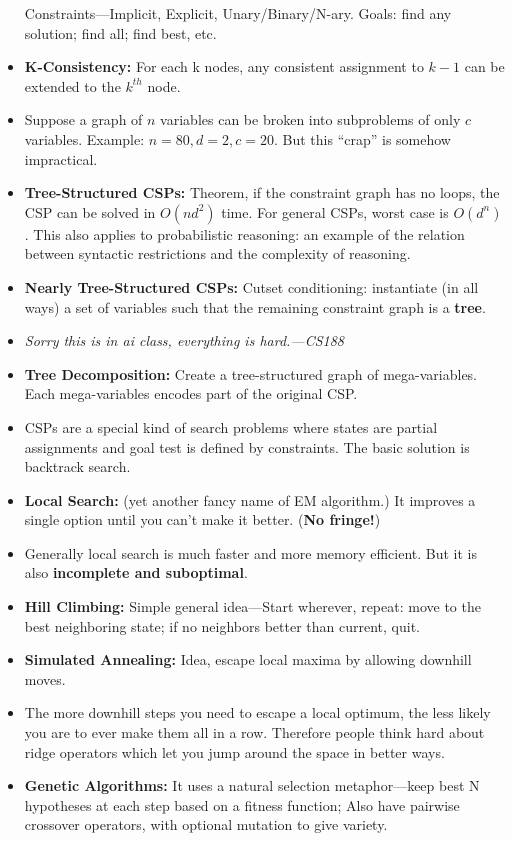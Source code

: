 \documentclass[twocolumn]{article}
\begin{document}
\begin{itemize}
  Constraints---Implicit, Explicit, Unary/Binary/N-ary. Goals: find
  any solution; find all; find best, etc.
\item \textbf{K-Consistency:} For each k nodes, any consistent
  assignment to $k-1$ can be extended to the $k^{th}$ node.
\item Suppose a graph of $n$ variables can be broken into subproblems
  of only $c$ variables. Example: $n=80, d=2, c=20$. But this ``crap''
  is somehow impractical. 
\item \textbf{Tree-Structured CSPs:} Theorem, if the constraint graph
  has no loops, the CSP can be solved in $O(nd^{2})$ time. For general
  CSPs, worst case is $O(d^{n})$. This also applies to probabilistic
  reasoning: an example of the relation between syntactic restrictions
  and the complexity of reasoning.
\item \textbf{Nearly Tree-Structured CSPs:} Cutset conditioning:
  instantiate (in all ways) a set of variables such that the remaining
  constraint graph is a \textbf{tree}.
\item \emph{Sorry this is in ai class, everything is hard.---CS188}
\item \textbf{Tree Decomposition:} Create a tree-structured graph of
  mega-variables. Each mega-variables encodes part of the original
  CSP. 
\item CSPs are a special kind of search problems where states are
  partial assignments and goal test is defined by constraints. The
  basic solution is backtrack search.
\item \textbf{Local Search:} (yet another fancy name of EM algorithm.)
  It improves a single option until you can't make it
  better. (\textbf{No fringe!}) 
\item Generally local search is much faster and more memory
  efficient. But it is also \textbf{incomplete and suboptimal}.
\item \textbf{Hill Climbing:} Simple general idea---Start wherever,
  repeat: move to the best neighboring state; if no neighbors better
  than current, quit.
\item \textbf{Simulated Annealing:} Idea, escape local maxima by
  allowing downhill moves.
\item The more downhill steps you need to escape a local optimum, the
  less likely you are to ever make them all in a row. Therefore people
  think hard about ridge operators which let you jump around the space
  in better ways.
\item \textbf{Genetic Algorithms:} It uses a natural selection
  metaphor---keep best N hypotheses at each step based on a fitness
  function; Also have pairwise crossover operators, with optional
  mutation to give variety. 
\end{itemize}
\end{document}
